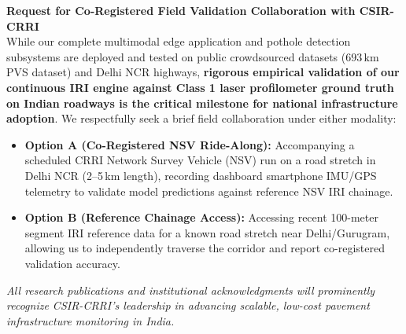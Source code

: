 \documentclass[9pt,a4paper]{extarticle}
\begin{document}
\vspace{3pt}

\begin{tcolorbox}[colback=crrigray, colframe=crriblue, arc=3pt, boxrule=1pt, left=6pt, right=6pt, top=3pt, bottom=3pt]
    \textbf{\large \color{crriblue}Request for Co-Registered Field Validation Collaboration with CSIR-CRRI}\\[2pt]
    \small
    While our complete multimodal edge application and pothole detection subsystems are deployed and tested on public crowdsourced datasets ($693\,\text{km}$ PVS dataset) and Delhi NCR highways, \textbf{rigorous empirical validation of our continuous IRI engine against Class 1 laser profilometer ground truth on Indian roadways is the critical milestone for national infrastructure adoption}. We respectfully seek a brief field collaboration under either modality:
    \begin{itemize}
        \item \textbf{Option A (Co-Registered NSV Ride-Along):} Accompanying a scheduled CRRI Network Survey Vehicle (NSV) run on a road stretch in Delhi NCR (2--5\,km length), recording dashboard smartphone IMU/GPS telemetry to validate model predictions against reference NSV IRI chainage.
        \item \textbf{Option B (Reference Chainage Access):} Accessing recent 100-meter segment IRI reference data for a known road stretch near Delhi/Gurugram, allowing us to independently traverse the corridor and report co-registered validation accuracy.
    \end{itemize}
    \textit{All research publications and institutional acknowledgments will prominently recognize CSIR-CRRI's leadership in advancing scalable, low-cost pavement infrastructure monitoring in India.}
\end{tcolorbox}
\end{document}
